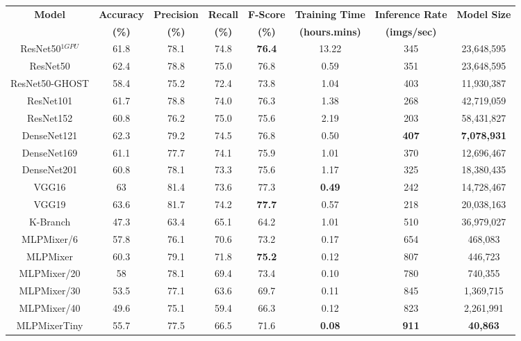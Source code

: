 \documentclass[journal]{IEEEtran}
\begin{document}
\begin{table*}[h!]
 \begin{tabular}{c c c c c c c c} 
 \toprule
 \multirow{2}{*}{\parbox{0.8 cm}{\textbf{Model}}} & \textbf{Accuracy} & \textbf{Precision} & \textbf{Recall} & \textbf{F-Score} &  \textbf{Training Time} & \textbf{Inference Rate} &  \textbf{Model Size}\\
    &\textbf{(\%)} &\textbf{(\%)} & \textbf{(\%)} & \textbf{(\%)} & \textbf{(hours.mins)} & \textbf{(imgs/sec)} \\
    
\midrule
 ResNet50$^{1 GPU}$ & 61.8 & 78.1 & 74.8 & \textbf{76.4} & 13.22 & 345 & 23,648,595\\
 \hhline{|=|=|=|=|=|=|=|=}
 ResNet50 & 62.4& 78.8 & 75.0 & 76.8& 0.59 &351& 23,648,595\\
 \hline
 ResNet50-GHOST & 58.4 & 75.2 & 72.4 & 73.8 & 1.04 & 403 & 11,930,387\\
 \hline
 ResNet101 & 61.7& 78.8& 74.0&76.3 &1.38 &268 & 42,719,059\\
 \hline
 ResNet152 & 60.8 & 76.2 & 75.0 & 75.6 & 2.19 & 203& 58,431,827\\
 \hline
 DenseNet121 & 62.3 & 79.2& 74.5 & 76.8 & 0.50 &  \textbf{407} & \textbf{7,078,931}\\
 \hline
 DenseNet169 & 61.1& 77.7&74.1 &75.9 & 1.01&370 & 12,696,467\\
 \hline
 DenseNet201 & 60.8 & 78.1& 73.3& 75.6& 1.17&325 &18,380,435\\
 \hline
 VGG16 & 63& 81.4& 73.6& 77.3&\textbf{0.49} & 242&14,728,467\\
 \hline 
 VGG19 & 63.6&81.7 &74.2 & \textbf{77.7}& 0.57 &218 &20,038,163 \\
\hhline{|=|=|=|=|=|=|=|=}
K-Branch & 47.3 & 63.4 & 65.1 & 64.2&1.01&510& 36,979,027 \\
\hhline{|=|=|=|=|=|=|=|=}
 MLPMixer/6 & 57.8 & 76.1 & 70.6 & 73.2 & 0.17 & 654 & 468,083\\
 \hline
 MLPMixer &60.3&79.1&71.8&\textbf{75.2}&0.12& 807& 446,723\\
 \hline
 MLPMixer/20 & 58 & 78.1 & 69.4 & 73.4 & 0.10 & 780 & 740,355\\
\hline
MLPMixer/30 & 53.5 & 77.1 & 63.6 & 69.7& 0.11 & 845 & 1,369,715\\
\hline
MLPMixer/40 &  49.6 & 75.1 & 59.4 & 66.3 & 0.12 & 823 & 2,261,991\\
 \hline
 MLPMixerTiny & 55.7 & 77.5&66.5 &71.6 & \textbf{0.08}& \textbf{911} &  \textbf{40,863}\\

\end{tabular}
\end{table*}
\end{document}
